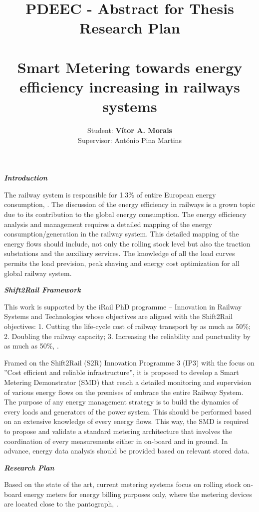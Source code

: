 \documentclass{article}
\title{ PDEEC - Abstract for Thesis Research Plan \\
\hrulefill \\ Smart Metering towards energy efficiency increasing in railways systems}
\author{Student: \textbf{Vítor A. Morais}\\
	 \small Supervisor: António Pina Martins}
\begin{document}
\maketitle

\textbf{\textit{Introduction}}


	The railway system is responsible for 1.3\% of entire European energy consumption, \citep{iea-uic2016}. The discussion of the energy efficiency in railways is a grown topic due to its contribution to the global energy consumption.
	The energy efficiency analysis and management requires a detailed mapping of the energy consumption/generation in the railway system. 
	This detailed mapping of the energy flows should include, not only the rolling stock level but also the traction substations and the auxiliary services.
	The knowledge of all the load curves permits the load prevision, peak shaving and energy cost optimization for all global railway system.



\textbf{\textit{Shift2Rail Framework}}

	This work is supported by the iRail PhD programme – Innovation in Railway Systems and Technologies whose objectives are aligned with the Shift2Rail objectives: 1. Cutting the life-cycle cost of railway transport by as much as 50\%; 2. Doubling the railway capacity; 3. Increasing the reliability and punctuality by as much as 50\%, \citep{shift2rail2015}.
	
	Framed on the Shift2Rail (S2R) Innovation Programme 3 (IP3) with the focus on ”Cost efficient and reliable infrastructure”, it is proposed to develop a Smart Metering Demonstrator (SMD) that reach a detailed monitoring and supervision of various energy flows on the premises of embrace the entire Railway System.
	The purpose of any energy management strategy is to build the dynamics of every loads and generators of the power system. 
	This should be performed based on an extensive knowledge of every energy flows. 
	This way, the SMD is required to propose and validate a standard metering architecture that involves the coordination of every measurements either in on-board and in ground. 
	In advance, energy data analysis should be provided based on relevant stored data. 
	
\textbf{\textit{Research Plan}}

Based on the state of the art, current metering systems focus on rolling stock on-board energy meters for energy billing purposes only, where the metering devices are located close to the pantograph, \citep{shift2rail2015}.
\end{document}
